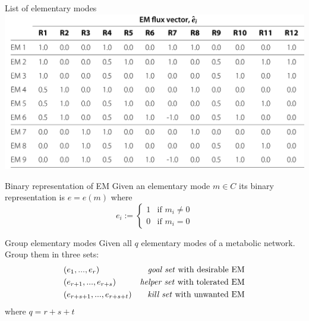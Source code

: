 \documentclass{beamer}
\begin{document}
\begin{frame}{List of elementary modes}
    \includegraphics[width=\textwidth]{grafik/table1a} \\
\end{frame}


\begin{frame}{Binary representation of EM}
    Given an elementary mode $m \in C$ its binary representation is $e = e(m)$ where
    $$
        e_{i} := %
        \begin{cases}
            1 & \text{if }  m_{i} \neq 0 \\
            0 & \text{if }  m_{i} = 0 
        \end{cases}
    $$
\end{frame}


\begin{frame}{Group elementary modes}
    Given all $q$ elementary modes of a metabolic network.
    Group them in three sets:
    \begin{align*}
        & (e_{1}, ..., e_{r})            &\text{\emph{goal set} with desirable EM}   &\\
        & (e_{r+1}, ..., e_{r+s})        &\text{\emph{helper set} with tolerated EM}      &\\
        & (e_{r+s+1}, ..., e_{r+s+t})    &\text{\emph{kill set} with unwanted EM}         &\\
    \end{align*}
where $q = r+s+t$
\end{frame}
\end{document}
